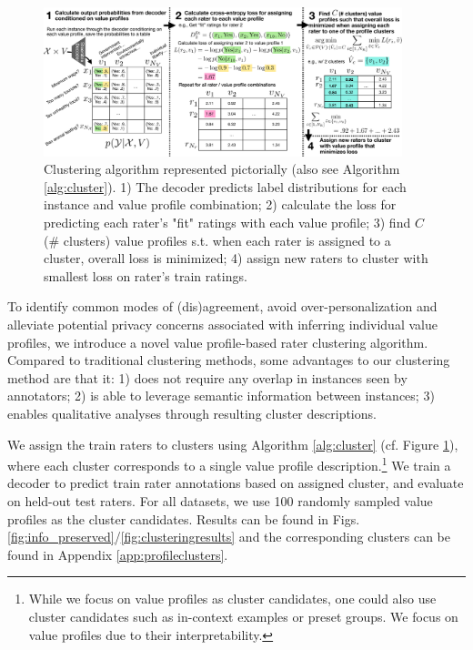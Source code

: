 \documentclass[11pt]{article}
\begin{document}
\begin{figure}[ht]
\centering
\vspace{-5pt}
\includegraphics[width=0.93\textwidth]{files/clusterfig.pdf}
\vspace{-5pt}
\caption{Clustering algorithm represented pictorially (also see Algorithm \ref{alg:cluster}).
1) The decoder predicts label distributions for each instance and value profile combination;
2) calculate the loss for predicting each rater's "fit" ratings with each value profile;
3) find $C$ (\# clusters) value profiles s.t. when each rater is assigned to a cluster, overall loss is minimized;
4) assign new raters to cluster with smallest loss on rater's train ratings.
}
\label{fig:clusteralgo}
\end{figure}

To identify common modes of (dis)agreement, avoid over-personalization \citep{kirk2024benefits} and alleviate potential privacy concerns associated with inferring individual value profiles, we introduce a novel value profile-based rater clustering algorithm. Compared to traditional clustering methods, some advantages to our clustering method are that it: 1) does not require any overlap in instances seen by annotators; 2) is able to leverage semantic information between instances; 3) enables qualitative analyses through resulting cluster descriptions.

We assign the train raters to clusters using Algorithm \ref{alg:cluster} (cf. Figure \ref{fig:clusteralgo}), where each cluster corresponds to a single value profile description.\footnote{While we focus on value profiles as cluster candidates, one could also use cluster candidates such as in-context examples or preset groups. We focus on value profiles due to their interpretability.} We train a decoder to predict train rater annotations based on assigned cluster, and evaluate on held-out test raters. For all datasets, we use 100 randomly sampled value profiles as the cluster candidates. Results can be found in Figs. \ref{fig:info_preserved}/\ref{fig:clusteringresults} and the corresponding clusters can be found in Appendix \ref{app:profileclusters}.
\end{document}
